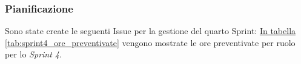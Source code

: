 \subsubsection{Pianificazione}
Sono state create le seguenti Issue per la gestione del quarto Sprint: 
\hyperref[tab:sprint4_ore_preventivate]{In tabella \ref{tab:sprint4_ore_preventivate}} vengono mostrate le ore preventivate per ruolo per lo \textit{Sprint 4}.

\begin{table}[H]
    \centering
    \caption{Ore preventivate per ruolo Sprint 4}
    \label{tab:sprint4_ore_preventivate}
\end{table}
